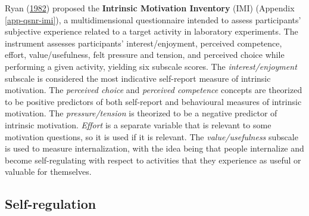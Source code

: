 \documentclass[letterpaper, nobind]{templates/ociamthesis}
\begin{document}
Ryan (\protect\hyperlink{ref-ryan1982control}{1982}) proposed the \textbf{Intrinsic Motivation Inventory} (IMI)
(Appendix \ref{app-qsnr-imi}), a multidimensional questionnaire intended to
assess participants' subjective experience related to a target activity
in laboratory experiments. The instrument assesses participants'
interest/enjoyment, perceived competence, effort, value/usefulness, felt
pressure and tension, and perceived choice while performing a given
activity, yielding six subscale scores. The \emph{interest/enjoyment}
subscale is considered the most indicative self-report measure of
intrinsic motivation. The \emph{perceived choice} and \emph{perceived competence}
concepts are theorized to be positive predictors of both self-report and
behavioural measures of intrinsic motivation. The \emph{pressure/tension} is
theorized to be a negative predictor of intrinsic motivation. \emph{Effort}
is a separate variable that is relevant to some motivation questions, so
it is used if it is relevant. The \emph{value/usefulness} subscale is used to
measure internalization, with the idea being that people internalize and
become self-regulating with respect to activities that they experience
as useful or valuable for themselves.

\hypertarget{sec-bg-learn-self-regulation}{%
\subsection{Self-regulation}\label{sec-bg-learn-self-regulation}}
\end{document}

